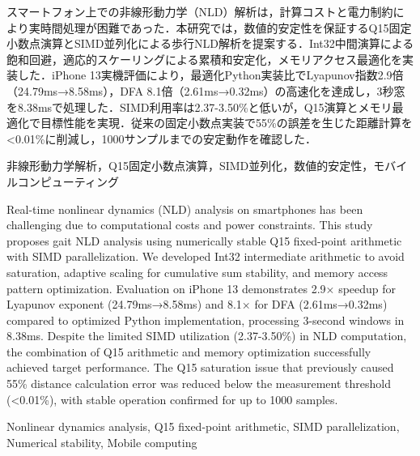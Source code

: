 \documentclass[paper]{ieice}
\begin{document}
\begin{jabstract}
スマートフォン上での非線形動力学（NLD）解析は，計算コストと電力制約により実時間処理が困難であった．本研究では，数値的安定性を保証するQ15固定小数点演算とSIMD並列化による歩行NLD解析を提案する．Int32中間演算による飽和回避，適応的スケーリングによる累積和安定化，メモリアクセス最適化を実装した．iPhone 13実機評価により，最適化Python実装比でLyapunov指数2.9倍（24.79ms→8.58ms），DFA 8.1倍（2.61ms→0.32ms）の高速化を達成し，3秒窓を8.38msで処理した．SIMD利用率は2.37-3.50\%と低いが，Q15演算とメモリ最適化で目標性能を実現．従来の固定小数点実装で55\%の誤差を生じた距離計算を<0.01\%に削減し，1000サンプルまでの安定動作を確認した．
\end{jabstract}

\begin{jkeyword}
非線形動力学解析，Q15固定小数点演算，SIMD並列化，数値的安定性，モバイルコンピューティング
\end{jkeyword}

\begin{eabstract}
Real-time nonlinear dynamics (NLD) analysis on smartphones has been challenging due to computational costs and power constraints. This study proposes gait NLD analysis using numerically stable Q15 fixed-point arithmetic with SIMD parallelization. We developed Int32 intermediate arithmetic to avoid saturation, adaptive scaling for cumulative sum stability, and memory access pattern optimization. Evaluation on iPhone 13 demonstrates 2.9× speedup for Lyapunov exponent (24.79ms→8.58ms) and 8.1× for DFA (2.61ms→0.32ms) compared to optimized Python implementation, processing 3-second windows in 8.38ms. Despite the limited SIMD utilization (2.37-3.50\%) in NLD computation, the combination of Q15 arithmetic and memory optimization successfully achieved target performance. The Q15 saturation issue that previously caused 55\% distance calculation error was reduced below the measurement threshold (<0.01\%), with stable operation confirmed for up to 1000 samples.
\end{eabstract}

\begin{ekeyword}
Nonlinear dynamics analysis, Q15 fixed-point arithmetic, SIMD parallelization, Numerical stability, Mobile computing
\end{ekeyword}

\maketitle
\end{document}
